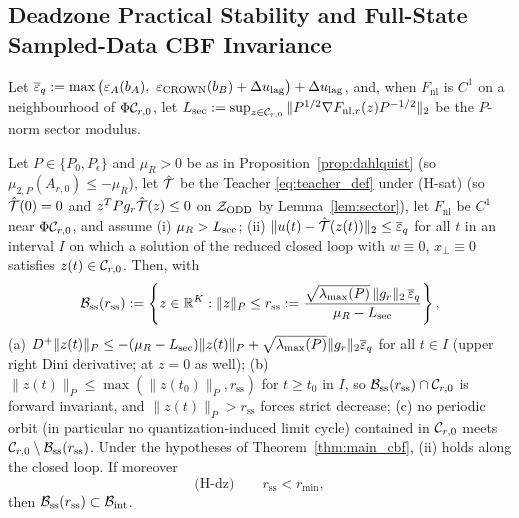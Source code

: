 \subsection{Deadzone Practical Stability and Full-State Sampled-Data CBF Invariance}

Let \(\overline{\varepsilon}_q := \max\big(\varepsilon_A(b_A),\ \varepsilon_{\mathrm{CROWN}}(b_B) + \Delta u_{\mathrm{lag}}\big) + \Delta u_{\mathrm{lag}}\), and, when \(F_{\mathrm{nl}}\) is \(C^1\) on a neighbourhood of \(\Phi\mathcal{C}_{r,0}\), let \(L_{\mathrm{sec}} := \sup_{z \in \mathcal{C}_{r,0}}\|P^{1/2}\nabla F_{\mathrm{nl},r}(z)P^{-1/2}\|_2\) be the \(P\)-norm sector modulus.

\begin{proposition}
\label{prop:deadzone_stability}
Let \(P \in \{P_0, P_\epsilon\}\) and \(\mu_R > 0\) be as in Proposition~\ref{prop:dahlquist} (so \(\mu_{2,P}(A_{r,0}) \le -\mu_R\)), let \(\hat{\mathcal{T}}\) be the Teacher \eqref{eq:teacher_def} under (H-sat) (so \(\hat{\mathcal{T}}(0) = 0\) and \(z^TPg_r\hat{\mathcal{T}}(z) \le 0\) on \(\mathcal{Z}_{\mathrm{ODD}}\) by Lemma~\ref{lem:sector}), let \(F_{\mathrm{nl}}\) be \(C^1\) near \(\Phi\mathcal{C}_{r,0}\), and assume
(i) \(\mu_R > L_{\mathrm{sec}}\); (ii) \(\|u(t) - \hat{\mathcal{T}}(z(t))\|_2 \le \overline{\varepsilon}_q\) for all \(t\) in an interval \(I\) on which a solution of the reduced closed loop with \(w \equiv 0\), \(x_\perp \equiv 0\) satisfies \(z(t) \in \mathcal{C}_{r,0}\). Then, with
\begin{equation}
\label{eq:rss_ball}
\mathcal{B}_{\mathrm{ss}}(r_{\mathrm{ss}}) := \left\{ z \in \mathbb{R}^K : \|z\|_P \le r_{\mathrm{ss}} := \frac{\sqrt{\lambda_{\max}(P)}\,\|g_r\|_2\,\overline{\varepsilon}_q}{\mu_R - L_{\mathrm{sec}}} \right\},
\end{equation}
(a) \(D^+\|z(t)\|_P \le -(\mu_R - L_{\mathrm{sec}})\|z(t)\|_P + \sqrt{\lambda_{\max}(P)}\|g_r\|_2\overline{\varepsilon}_q\) for all \(t \in I\) (upper right Dini derivative; at \(z = 0\) as well); (b) \(\|z(t)\|_P \le \max(\|z(t_0)\|_P, r_{\mathrm{ss}})\) for \(t \ge t_0\) in \(I\), so \(\mathcal{B}_{\mathrm{ss}}(r_{\mathrm{ss}})\cap\mathcal{C}_{r,0}\) is forward invariant, and \(\|z(t)\|_P > r_{\mathrm{ss}}\) forces strict decrease; (c) no periodic orbit (in particular no quantization-induced limit cycle) contained in \(\mathcal{C}_{r,0}\) meets \(\mathcal{C}_{r,0} \setminus \mathcal{B}_{\mathrm{ss}}(r_{\mathrm{ss}})\). Under the hypotheses of Theorem~\ref{thm:main_cbf}, (ii) holds along the closed loop. If moreover
\begin{equation}
\label{eq:deadzone_cond}
\text{(H-dz)}\qquad r_{\mathrm{ss}} < r_{\min},
\end{equation}
then \(\mathcal{B}_{\mathrm{ss}}(r_{\mathrm{ss}}) \subset \mathcal{B}_{\mathrm{int}}\).
\end{proposition}

